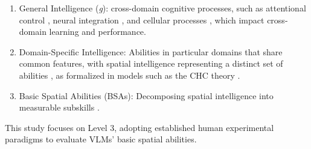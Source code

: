 \begin{enumerate}

\item General Intelligence (\textit{g}): cross-domain cognitive processes, such as attentional control \cite{kaneRolePrefrontalCortex2002}, neural integration \cite{jungParietofrontalIntegrationTheory2007}, and cellular processes \cite{gearyInclassAttentionSpatial2021}, which impact cross-domain learning and performance.

\item Domain-Specific Intelligence: Abilities in particular domains that share common features, with spatial intelligence representing a distinct set of abilities \cite{vernonAbilityFactorsEnvironmental1965}, as formalized in models such as the CHC theory \cite{carrollHumanCognitiveAbilities1993, hornOrganizationAbilitiesDevelopment1968, cattellTheoryFluidCrystallized1963}.

\item Basic Spatial Abilities (BSAs): Decomposing spatial intelligence into measurable subskills \cite{johnsonSexDifferencesMental2007, hegartySpatialAbilitiesDifferent2006, maierSpatialGeometrySpatial1996, voyerMagnitudeSexDifferences1995, halpernSexDifferencesCognitive1992, pellegrinoUnderstandingSpatialAbility1984}.

\end{enumerate}

This study focuses on Level 3, adopting established human experimental paradigms to evaluate VLMs' basic spatial abilities.

